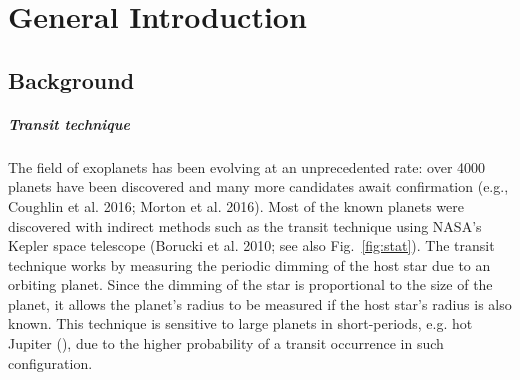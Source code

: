 \chapter{General Introduction} \label{sec:intro}
\section{Background} %
\paragraph{Transit technique}
The field of exoplanets has been evolving at an unprecedented rate: over 4000 planets have been discovered and many more candidates await confirmation (e.g., Coughlin et al. 2016; Morton et al. 2016). 
Most of the known planets were discovered with indirect methods such as the transit technique using NASA's Kepler space telescope (Borucki et al. 2010; see also Fig.~\ref{fig:stat}). The transit technique works by measuring the periodic dimming of the host star due to an orbiting planet. Since the dimming of the star is proportional to the size of the planet, it allows the planet’s radius to be measured if the host star's radius is also known. This technique is sensitive to large planets in short-periods, e.g. hot Jupiter (\cite{Mayor1995}), due to the higher probability of a transit occurrence in such configuration.  


